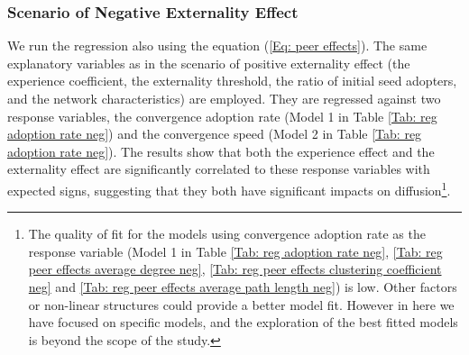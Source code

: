 \documentclass{bmcart}
\renewcommand{\tablename}{Table }
\begin{document}
\subsubsection*{Scenario of Negative Externality Effect}
\label{Sec: experience effect and externality effect neg}
We run the regression also using the equation (\ref{Eq: peer effects}). The same explanatory variables as in the scenario of positive externality effect (the experience coefficient, the externality threshold, the ratio of initial seed adopters, and the network characteristics) are employed. They are regressed against two response variables, the convergence adoption rate (Model 1 in \tablename \ref{Tab: reg adoption rate neg}) and the convergence speed (Model 2 in \tablename \ref{Tab: reg adoption rate neg}). The results show that both the experience effect and the externality effect are significantly correlated to these response variables with expected signs, suggesting that they both have significant impacts on diffusion\footnote{The quality of fit for the models using convergence adoption rate as the response variable (Model 1 in \tablename \ref{Tab: reg adoption rate neg}, \ref{Tab: reg peer effects average degree neg}, \ref{Tab: reg peer effects clustering coefficient neg} and \ref{Tab: reg peer effects average path length neg}) is low. Other factors or non-linear structures could provide a better model fit. However in here we have focused on specific models, and the exploration of the best fitted models is beyond the scope of the study.}. 

\begin{table}
\begin{center}
\caption{Regression on Convergence Adoption Rate and Convergence Speed (Negative Externality Effect)}
\end{center}
\end{table}
\end{document}

